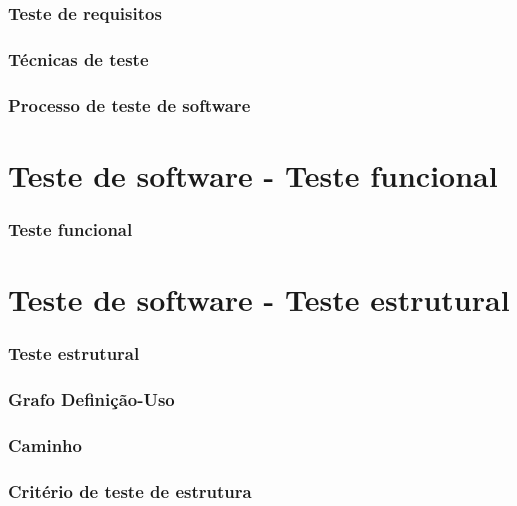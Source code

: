 \documentclass[utf8, usepdftitle=false, svgnames, color={table,
fixpdftex, hyperref, fixinclude, xcdraw}, t, brazil]{beamer}
\begin{document}
 \section{Teste de requisitos}
 

 \section{Técnicas de teste}
  
 
 \section{Processo de teste de software}
  
 
 \part{Teste de software - Teste funcional}
 
 \section{Teste funcional}
 
 
 \part{Teste de software - Teste estrutural}
 
 \section{Teste estrutural}
 
 
 \section{Grafo Definição-Uso}
 

 \section{Caminho}
 

 \section{Critério de teste de estrutura}
 
 
\end{document}
